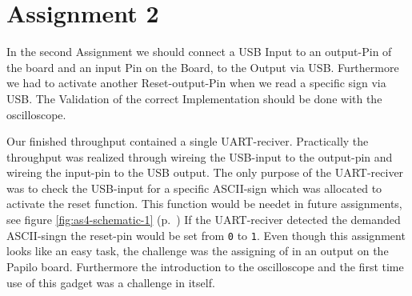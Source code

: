 \section*{Assignment 2}

In the second Assignment we should connect a USB Input to an output-Pin of the board and an input Pin on the Board, to the Output via USB. Furthermore we had to activate another Reset-output-Pin when we read a specific sign via USB. The Validation of the correct Implementation should be done with the oscilloscope.

Our finished throughput contained a single UART-reciver. Practically the throughput was realized through wireing the USB-input to the output-pin and wireing the input-pin to the USB output. The only purpose of the UART-reciver was to check the USB-input for a specific ASCII-sign which was allocated to activate the reset function. This function would be needet in future assignments, see figure \ref{fig:as4-schematic-1} (p.~\pageref{fig:as4-schematic-1}) If the UART-reciver detected the demanded ASCII-singn the reset-pin would be set from \verb+0+ to \verb+1+. Even though this assignment looks like an easy task, the challenge was the assigning of in an output on the Papilo board. Furthermore the introduction to the oscilloscope and the first time use of this gadget was a challenge in itself.




